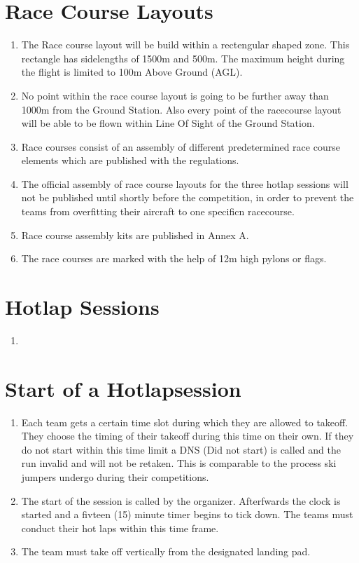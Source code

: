     \section{Race Course Layouts}
    \begin{enumerate}
      \item The Race course layout will be build within a rectengular shaped zone. This rectangle has sidelengths of 1500m and 500m. The maximum height during the flight is limited to 100m Above Ground (AGL).
      \item No point within the race course layout is going to be further away than 1000m from the Ground Station. Also every point of the racecourse layout will be able to be flown within Line Of Sight of the Ground Station. 
      \item Race courses consist of an assembly of different predetermined race course elements which are published with the regulations.
      \item The official assembly of race course layouts for the three hotlap sessions will not be published until shortly before the competition, in order to prevent the teams from overfitting their aircraft to one specificn racecourse. 
      \item Race course assembly kits are published in Annex A. 
      \item The race courses are marked with the help of 12m high pylons or flags. 
    \end{enumerate}
  
    \section{Hotlap Sessions}
    \begin{enumerate}
      \item 
    \end{enumerate}


    \section{Start of a Hotlapsession}
    \begin{enumerate}
      \item Each team gets a certain time slot during which they are allowed to takeoff. They choose the timing of their takeoff during this time on their own. If they do not start within this time limit a DNS (Did not start) is called and the run invalid and will not be retaken. This is comparable to the process ski jumpers undergo during their competitions.
      \item The start of the session is called by the organizer. Afterfwards the clock is started and a fivteen (15) minute timer begins to tick down. The teams must conduct their hot laps within this time frame.
      \item The team must take off vertically from the designated landing pad.  
    \end{enumerate}

